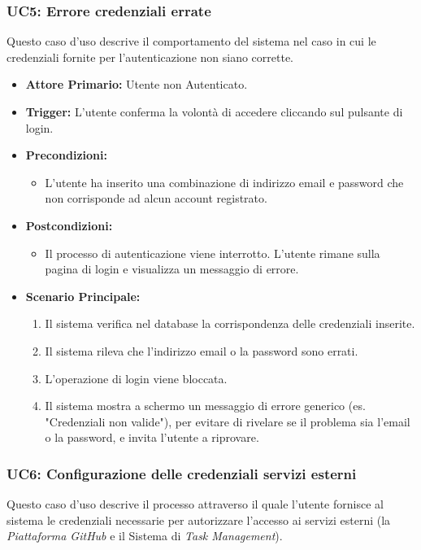 \documentclass[12pt, a4paper]{article}
\begin{document}
\subsubsection{UC5: Errore credenziali errate}\label{uc:5}
Questo caso d'uso descrive il comportamento del sistema nel caso in cui le credenziali fornite per l'autenticazione non siano corrette.
\begin{itemize}
    \item \textbf{Attore Primario:} Utente non Autenticato.
    \item \textbf{Trigger:} L'utente conferma la volontà di accedere cliccando sul pulsante di login.
    \item \textbf{Precondizioni:}\begin{itemize}\item L'utente ha inserito una combinazione di indirizzo email e password che non corrisponde ad alcun account registrato.\end{itemize}
    \item \textbf{Postcondizioni:}\begin{itemize}\item Il processo di autenticazione viene interrotto. L'utente rimane sulla pagina di login e visualizza un messaggio di errore.\end{itemize}
    \item \textbf{Scenario Principale:}
    \begin{enumerate}
        \item Il sistema verifica nel database la corrispondenza delle credenziali inserite.
        \item Il sistema rileva che l'indirizzo email o la password sono errati.
        \item L'operazione di login viene bloccata.
        \item Il sistema mostra a schermo un messaggio di errore generico (es. "Credenziali non valide"), per evitare di rivelare se il problema sia l'email o la password, e invita l'utente a riprovare.
    \end{enumerate}
\end{itemize}


\subsubsection{UC6: Configurazione delle credenziali servizi esterni}\label{uc:6}
Questo caso d'uso descrive il processo attraverso il quale l'utente fornisce al sistema le credenziali necessarie per autorizzare l'accesso ai servizi esterni (la \textit{Piattaforma GitHub} e il Sistema di \textit{Task Management}).
\end{document}
